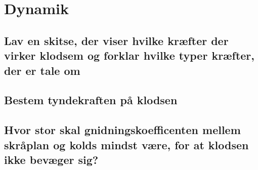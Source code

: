 \section{Dynamik}
\subsection{Lav en skitse, der viser hvilke kræfter der virker klodsem og forklar hvilke typer kræfter, der er tale om}

\subsection{Bestem tyndekraften på klodsen}

\subsection{Hvor stor skal gnidningskoefficenten mellem skråplan og kolds mindst være, for at klodsen ikke bevæger sig?}
